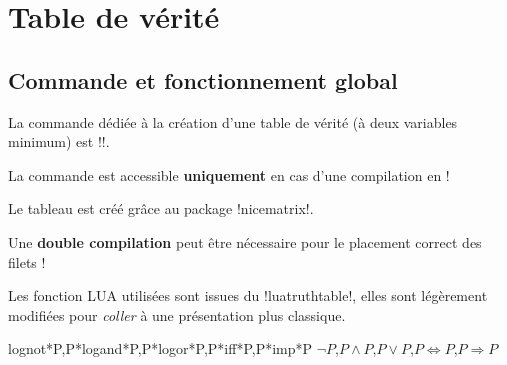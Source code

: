 \documentclass[french,a4paper,11pt]{article}
\begin{document}
{{\begin{DemoCode}[]
\end{DemoCode}

\pagebreak

\section{Table de vérité}

\subsection{Commande et fonctionnement global}

\begin{cautionblock}
La commande dédiée à la création d'une table de vérité (à deux variables minimum) est \motcletex!\TableVerite!.

La commande est accessible \textbf{uniquement} en cas d'une compilation en  !

Le tableau est créé grâce au package \packagetex!nicematrix!.
\end{cautionblock}

\begin{importantblock}
Une \textbf{double compilation} peut être nécessaire pour le placement correct des filets !

Les fonction \textsf{LUA} utilisées sont issues du \packagetex!luatruthtable!, elles sont légèrement modifiées pour \textit{coller} à une présentation plus classique.
\end{importantblock}

\begin{DemoCode}
\end{DemoCode}

\begin{DemoCode}[]
%
	{lognot*P,P*logand*P,P*logor*P,P*iff*P,P*imp*P}%
	{$\lnot P$,$P \land P$,$P \lor P$,$P \Leftrightarrow P$,$P \Rightarrow P$}
\end{DemoCode}

}}
\end{document}
